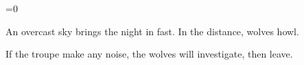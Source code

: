 \ifnum\value{cycle}=0


\begin{boxtext}
  An overcast sky brings the night in fast.
  In the distance, wolves howl.
\end{boxtext}

If the troupe make any noise, the wolves will investigate, then leave.

\wolf

\fi

